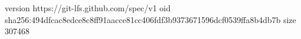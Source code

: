 version https://git-lfs.github.com/spec/v1
oid sha256:494dfcac8edce8c8ff91aacce81cc406fdf3b9373671596dcf0539ffa8b4db7b
size 307468
